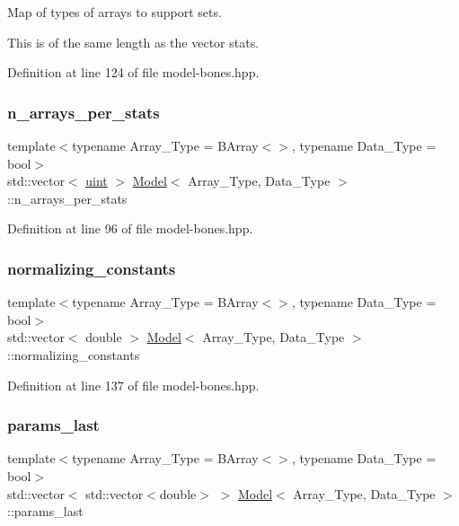 Map of types of arrays to support sets. 

This is of the same length as the vector {\ttfamily stats}. 

Definition at line 124 of file model-\/bones.\+hpp.

\mbox{\label{class_model_ab43351423d375b537a1a6a497c65caa1}} 
\subsubsection{\texorpdfstring{n\+\_\+arrays\+\_\+per\+\_\+stats}{n\_arrays\_per\_stats}}
{\footnotesize\ttfamily template$<$typename Array\+\_\+\+Type  = B\+Array$<$$>$, typename Data\+\_\+\+Type  = bool$>$ \\
std\+::vector$<$ \hyperlink{typedefs_8hpp_a91ad9478d81a7aaf2593e8d9c3d06a14}{uint} $>$ \hyperlink{class_model}{Model}$<$ Array\+\_\+\+Type, Data\+\_\+\+Type $>$\+::n\+\_\+arrays\+\_\+per\+\_\+stats}



Definition at line 96 of file model-\/bones.\+hpp.

\mbox{\label{class_model_ad4ec6d7a19e7a47fb6ffabbf191e1877}} 
\subsubsection{\texorpdfstring{normalizing\+\_\+constants}{normalizing\_constants}}
{\footnotesize\ttfamily template$<$typename Array\+\_\+\+Type  = B\+Array$<$$>$, typename Data\+\_\+\+Type  = bool$>$ \\
std\+::vector$<$ double $>$ \hyperlink{class_model}{Model}$<$ Array\+\_\+\+Type, Data\+\_\+\+Type $>$\+::normalizing\+\_\+constants}



Definition at line 137 of file model-\/bones.\+hpp.

\mbox{\label{class_model_a627aaec1fe2c0e25546f68da78b0c00b}} 
\subsubsection{\texorpdfstring{params\+\_\+last}{params\_last}}
{\footnotesize\ttfamily template$<$typename Array\+\_\+\+Type  = B\+Array$<$$>$, typename Data\+\_\+\+Type  = bool$>$ \\
std\+::vector$<$ std\+::vector$<$double$>$ $>$ \hyperlink{class_model}{Model}$<$ Array\+\_\+\+Type, Data\+\_\+\+Type $>$\+::params\+\_\+last}



